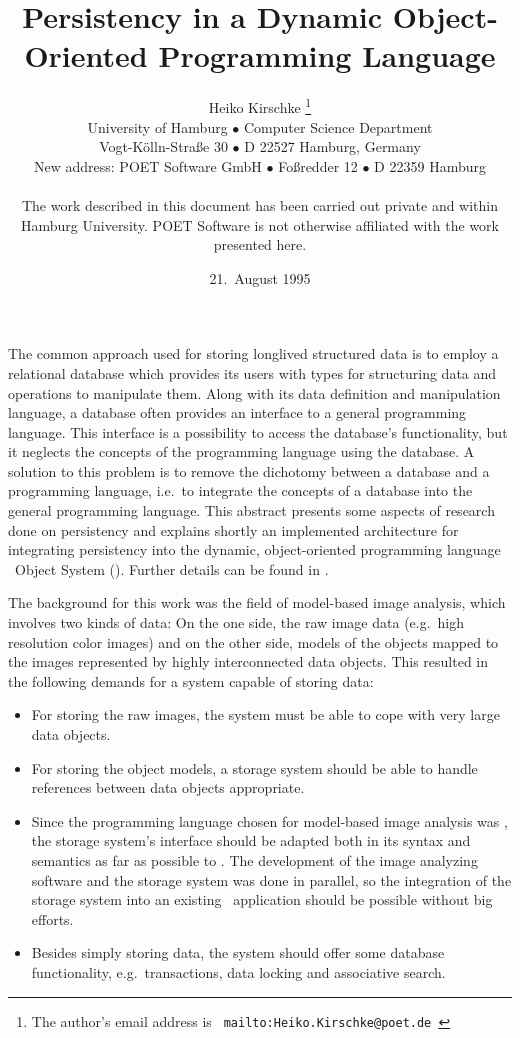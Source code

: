 \documentclass[a4paper%
]{article}
\title{%
Persistency in a Dynamic Object-Oriented Programming Language}
\author{%
Heiko Kirschke%
\thanks{The author's email address is
\texttt{%
mailto:Heiko.Kirschke@poet.de%
}}%
\\[\smallskipamount]
\small University of Hamburg $\bullet$
Computer Science Department\vspace{-0.25\baselineskip}\\
\small Vogt-K\"{o}lln-Stra\ss{}e 30 $\bullet$
D 22527 Hamburg, Germany\\[\medskipamount]
\small New address: POET Software GmbH $\bullet$
Fo\ss{}redder 12 $\bullet$
D 22359 Hamburg\\[\smallskipamount]
\parbox{\textwidth}{\small The work described in this document has
been carried out private and within Hamburg University.  POET Software is not
otherwise affiliated with the work presented here.}}%
\date{21.\ August 1995}
\begin{document}
%
\maketitle
%
%
\noindent%
The common approach used for storing longlived structured data is to
employ a relational database which provides its users with types for
structuring data and operations to manipulate them.  Along with its
data definition and manipulation language, a database often provides
an interface to a general programming language.  This interface is a
possibility to access the database's functionality, but it neglects
the concepts of the programming language using the database.  A
solution to this problem is to remove the dichotomy between a database
and a programming language, i.e.\ to integrate the concepts of a
database into the general programming language.  This abstract
presents some aspects of research done on persistency and explains
shortly an implemented architecture for integrating persistency into
the dynamic, object-oriented programming language \cl\ Object System
(\clos).  Further details can be found in
\cite{bib:ki94a,bib:ki94b,bib:ki95}.
%
\par{}The background for this work was the field of model-based image
analysis, which involves two kinds of data: On the one side, the raw
image data (e.g.\ high resolution color images) and on the other side,
models of the objects mapped to the images represented by highly
interconnected data objects.  This resulted in the following demands
for a system capable of storing data:
%
\begin{itemize}
%
\item For storing the raw images, the system must be able to cope with
very large data objects.
%
\item For storing the object models, a storage system should be able to
handle references between data objects appropriate.
%
\item Since the programming language chosen for model-based image
analysis was \clos, the storage system's interface should be adapted
both in its syntax and semantics as far as possible to \clos.  The
development of the image analyzing software and the storage system was
done in parallel, so the integration of the storage system into an
existing \clos\ application should be possible without big efforts.
%
\item Besides simply storing data, the system should offer some
database functionality, e.g.\ transactions, data locking and
associative search.
%
\end{itemize}
\end{document}

